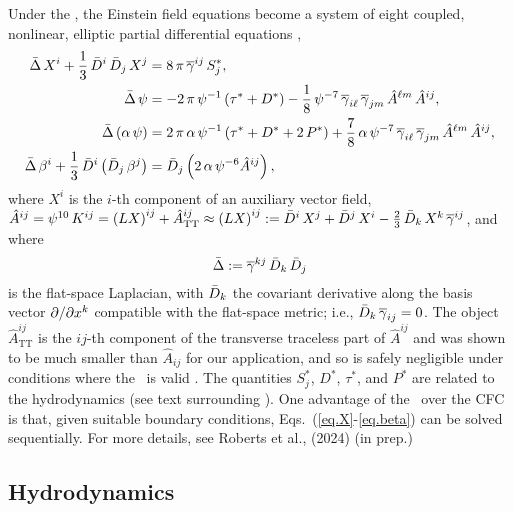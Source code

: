 Under the \xcfc, the Einstein field equations become a system of eight
coupled, nonlinear, elliptic partial differential equations \citep{ccd2009},
\begin{subequations}
  \begin{align}
    \bar{\Delta}\,X^{i}+\frac{1}{3}\,\bar{D}^{i}\,\bar{D}_{j}\,X^{j}
    &=8\,\pi\,\overline{\gamma}^{ij}\,S^{*}_{j},\label{eq.X}\\
    \bar{\Delta}\,\psi&=-2\,\pi\,\psi^{-1}\left(\tau^{*}+D^{*}\right)
    -\frac{1}{8}\,\psi^{-7}\,\overline{\gamma}_{i\ell}\,\overline{\gamma}_{jm}\,
    \hat{A}^{\ell m}\,\hat{A}^{ij},\label{eq.psi}\\
    \bar{\Delta}\left(\alpha\,\psi\right)&=2\,\pi\,\alpha\,\psi^{-1}
    \left(\tau^{*}+D^{*}+2\,P^{*}\right)+\frac{7}{8}\,\alpha\,\psi^{-7}\,
    \overline{\gamma}_{i\ell}\,\overline{\gamma}_{jm}\,\hat{A}^{\ell m}\,\hat{A}^{ij},
    \label{eq.alphaPsi}\\
    \bar{\Delta}\,\beta^{i}
    +\frac{1}{3}\,\bar{D}^{i}\left(\bar{D}_{j}\,\beta^{j}\right)&=
    \bar{D}_{j}\left(2\,\alpha\,\psi^{-6}\hat{A}^{ij}\right),\label{eq.beta}
  \end{align}
\end{subequations}
where $X^{i}$ is the $i$-th component of an auxiliary vector field,
$\hat{A}^{ij}=\psi^{10}\,K^{ij}
=\left(LX\right)^{ij}+\hat{A}^{ij}_{\mathrm{TT}}\approx
\left(LX\right)^{ij}:=\bar{D}^{i}\,X^{j}+\bar{D}^{j}\,X^{i}
-\frac{2}{3}\,\bar{D}_{k}\,X^{k}\,\overline{\gamma}^{ij}$, and where
\begin{equation}
  \bar{\Delta}:=\overline{\gamma}^{kj}\,\bar{D}_{k}\,\bar{D}_{j}
\end{equation}
is the flat-space Laplacian, with $\bar{D}_{k}$ the covariant derivative
along the basis vector $\partial/\partial x^{k}$
compatible with the flat-space metric;
i.e., $\bar{D}_{k}\,\overline{\gamma}_{ij}=0$.
The object $\hat{A}^{ij}_{\mathrm{TT}}$ is the $ij$-th component of the
transverse traceless part of $\hat{A}^{ij}$ and was shown to be much
smaller than $\hat{A}_{ij}$ for our application,
and so is safely negligible under conditions
where the \xcfc\ is valid \citep{ccd2009}.
The quantities $S^{*}_{j}$, $D^{*}$, $\tau^{*}$, and $P^{*}$ are related to the
hydrodynamics (see text surrounding ).
One advantage of the \xcfc\ over the CFC is that,
given suitable boundary conditions,
Eqs.~(\ref{eq.X}-\ref{eq.beta}) can be solved sequentially.
For more details, see Roberts et al., (2024) (in prep.)

\subsection{Hydrodynamics}
\label{ss.hydrodynamics}

